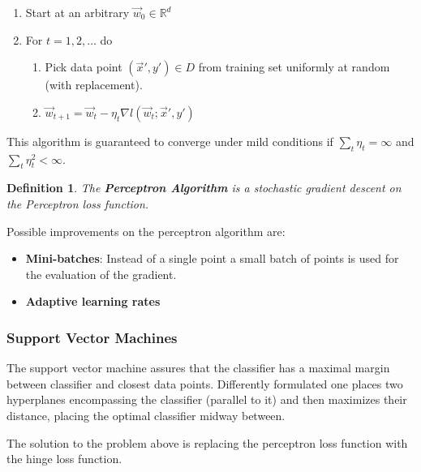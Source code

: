 \documentclass[10pt,a4paper]{scrartcl}
\newtheorem{define}{Definition}
\newcommand{\Argmin}[2]{\text{arg}\underset{#1}{\min}\left(#2\right)}
\begin{document}
\begin{multicols*}{2}
\begin{enumerate}
\item Start at an arbitrary $\vec{w}_0\in\mathbb{R}^d$
\item For $t=1,2,\ldots$ do
\begin{enumerate}
\item Pick data point $(\vec{x}',y')\in D$ from training set uniformly at random (with replacement).
\item $\vec{w}_{t+1}=\vec{w}_t-\eta_t\nabla l(\vec{w}_t;\vec{x}',y')$
\end{enumerate}
\end{enumerate}

This algorithm is guaranteed to converge under mild conditions if $\sum\limits_{t}\eta_t=\infty$ and $\sum\limits_{t}\eta_t^2<\infty$.

\begin{define}
The \textbf{Perceptron Algorithm} is a stochastic gradient descent on the Perceptron loss function.
\end{define}

Possible improvements on the perceptron algorithm are:

\begin{itemize}
\item \textbf{Mini-batches}: Instead of a single point a small batch of points is used for the evaluation of the gradient.
\item \textbf{Adaptive learning rates} 
\end{itemize}

\subsubsection{Support Vector Machines}

The support vector machine assures that the classifier has a maximal margin between classifier and closest data points. Differently formulated one places two hyperplanes encompassing the classifier (parallel to it) and then maximizes their distance, placing the optimal classifier midway between.

The solution to the problem above is replacing the perceptron loss function with the hinge loss function.


\importname{SVM}{$\vec{w}^\ast=\Argmin{\vec{w}}{\sum\limits_{i=1}^n\max\{0,1-y_i\vec{w}^T\vec{x}_i\}+\lambda||\vec{w}||_2^2}$}


\end{multicols*}
\end{document}
